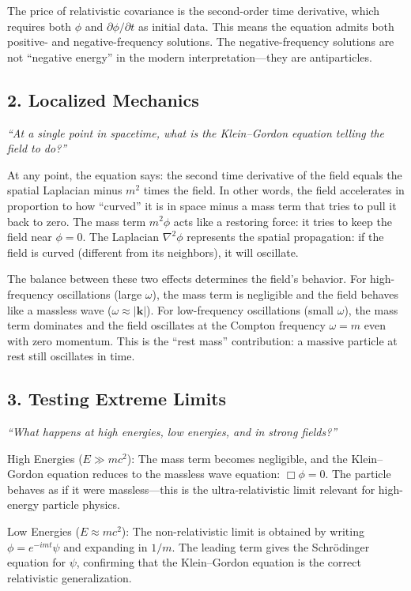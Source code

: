\documentclass[11pt,openright]{book}
\begin{document}
The price of relativistic covariance is the second-order time derivative, which requires both $\phi$ and $\partial\phi/\partial t$ as initial data. This means the equation admits both positive- and negative-frequency solutions. The negative-frequency solutions are not ``negative energy'' in the modern interpretation---they are antiparticles.

\subsection*{2. Localized Mechanics}
\textit{``At a single point in spacetime, what is the Klein--Gordon equation telling the field to do?''}

At any point, the equation says: the second time derivative of the field equals the spatial Laplacian minus $m^2$ times the field. In other words, the field accelerates in proportion to how ``curved'' it is in space minus a mass term that tries to pull it back to zero. The mass term $m^2\phi$ acts like a restoring force: it tries to keep the field near $\phi = 0$. The Laplacian $\nabla^2\phi$ represents the spatial propagation: if the field is curved (different from its neighbors), it will oscillate.

The balance between these two effects determines the field's behavior. For high-frequency oscillations (large $\omega$), the mass term is negligible and the field behaves like a massless wave ($\omega \approx |\mathbf{k}|$). For low-frequency oscillations (small $\omega$), the mass term dominates and the field oscillates at the Compton frequency $\omega = m$ even with zero momentum. This is the ``rest mass'' contribution: a massive particle at rest still oscillates in time.

\subsection*{3. Testing Extreme Limits}
\textit{``What happens at high energies, low energies, and in strong fields?''}

High Energies ($E \gg mc^2$): The mass term becomes negligible, and the Klein--Gordon equation reduces to the massless wave equation: $\Box\phi = 0$. The particle behaves as if it were massless---this is the ultra-relativistic limit relevant for high-energy particle physics.

Low Energies ($E \approx mc^2$): The non-relativistic limit is obtained by writing $\phi = e^{-imt}\psi$ and expanding in $1/m$. The leading term gives the Schr\"odinger equation for $\psi$, confirming that the Klein--Gordon equation is the correct relativistic generalization.
\end{document}
